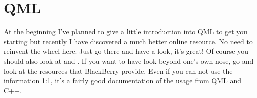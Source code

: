 %
\section{QML}
%
At the beginning I've planned to give a little introduction into QML to get you starting but recently I have discovered a much better online resource\cite{qml01}. No need to reinvent the wheel here. Just go there and have a look, it's great! 
%
Of course you should also look at \cite{qt05} and \cite{qt06}. If you want to have look beyond one's own nose, go and look at the resources that BlackBerry provide\cite{bb01}. Even if you can not use the information 1:1, it's a fairly good documentation of the usage from QML and C++.
